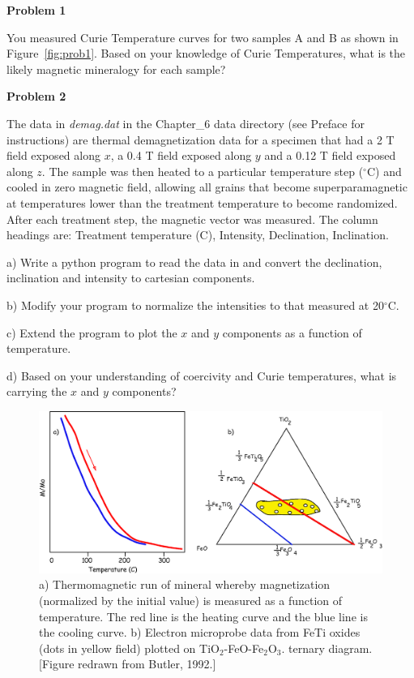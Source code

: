 {{\parindent 0pt \parskip 12pt 

{\bf Problem 1}

You measured Curie Temperature curves for two samples A and B as shown in Figure~\ref{fig:prob1}.  Based on your knowledge of Curie Temperatures,  what is the likely magnetic mineralogy for each sample?  



{\bf Problem 2}

The data in {\it demag.dat} in the Chapter\_6 data directory (see Preface for instructions) are thermal demagnetization data for a 
specimen that had a 2 T field exposed along $x$, a 0.4 T field
exposed along $y$ and a 0.12 T field exposed along $z$.    The sample was then heated to a particular temperature
step ($^{\circ}$C) and cooled in zero magnetic field, allowing all grains that become superparamagnetic at temperatures lower than the treatment temperature to become randomized.  After each treatment step, the magnetic vector was measured.    The column headings are:  Treatment temperature (C), Intensity, Declination, Inclination.  


a) Write a python program to read the data in and convert the declination, inclination and intensity to cartesian components.  

b) Modify your program to normalize the intensities to that measured at  20$^{\circ}$C. 

c)  Extend the program to plot  the $x$ and $y$ components as a function of temperature.   

d)  Based on your understanding of coercivity and Curie temperatures, what is carrying the $x$ and $y$ components?  

\begin{figure}[h!tb]
\includegraphics[width=13 cm]{EPSfiles/microprobe.eps}
\caption{a) Thermomagnetic run of mineral whereby magnetization (normalized by the initial value) is measured as a function of temperature.  The red line is the heating curve and the blue line is the cooling curve.  b) Electron microprobe data  from FeTi oxides (dots in yellow field) plotted on TiO$_2$-FeO-Fe$_2$O$_3$.
ternary diagram. [Figure redrawn from Butler, 1992.]}
\label{fig:microprobe}
\end{figure}



}}
